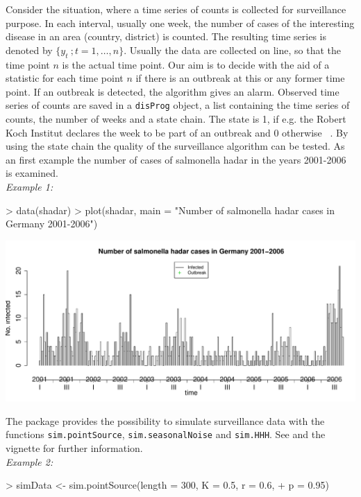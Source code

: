 \documentclass[a4paper,11pt]{article}
\begin{document}
Consider the situation, where a time series of counts is collected for surveillance purpose. In each interval, usually one week, the number of cases of the interesting disease in an area (country, district) is counted. The resulting time series is denoted by $\{y_t\>;t=1,\ldots,n\}$. Usually the data are collected on line, so that the time point $n$ is the actual time point. Our aim is to decide with the aid of a statistic for each time point $n$ if there is an outbreak at this or any former time point. If an outbreak is detected, the algorithm gives an alarm. Observed time series of counts are saved in a \verb+disProg+ object, a list containing the time series of counts, the number of weeks and a state chain.  
The state is 1, if e.g. the Robert Koch Institut declares the week to be part of an outbreak and 0 otherwise ~\citep{survstat}. By using the state chain the quality of the surveillance algorithm can be tested.
As an first example the number of cases of salmonella hadar in the years 2001-2006 is examined.  \\

\textit{Example 1:}
\begin{Schunk}
\begin{Sinput}
> data(shadar)
> plot(shadar, main = "Number of salmonella hadar cases in Germany 2001-2006")
\end{Sinput}
\end{Schunk}
\includegraphics{figs/vignette_glrnb-002}

The package provides the possibility to simulate surveillance data with the functions \verb+sim.pointSource+, \verb+sim.seasonalNoise+ and \verb+sim.HHH+. See \citep{hoehle2007R} and the vignette for further information. \\

\textit{Example 2:}

\begin{Schunk}
\begin{Sinput}
> simData <- sim.pointSource(length = 300, K = 0.5, r = 0.6, 
+     p = 0.95)
\end{Sinput}
\end{Schunk}
\end{document}
